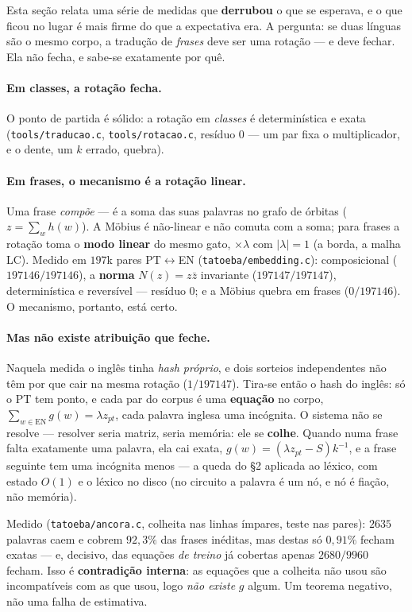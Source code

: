 \documentclass[11pt]{article}
\newcommand{\code}[1]{\texttt{\small #1}}
\theoremstyle{plain}
\theoremstyle{remark}
\begin{document}
Esta seção relata uma série de medidas que \textbf{derrubou} o que se esperava, e o que ficou no lugar
é mais firme do que a expectativa era. A pergunta: se duas línguas são o mesmo corpo, a tradução de
\emph{frases} deve ser uma rotação --- e deve fechar. Ela não fecha, e sabe-se exatamente por quê.

\paragraph{Em classes, a rotação fecha.} O ponto de partida é sólido: a rotação em \emph{classes} é
determinística e exata (\code{tools/traducao.c}, \code{tools/rotacao.c}, resíduo $0$ --- um par fixa o
multiplicador, e o dente, um $k$ errado, quebra).

\paragraph{Em frases, o mecanismo é a rotação linear.} Uma frase \emph{compõe} --- é a soma das suas
palavras no grafo de órbitas ($z=\sum_w h(w)$). A Möbius é não-linear e não comuta com a soma; para
frases a rotação toma o \textbf{modo linear} do mesmo gato, $\times\lambda$ com $|\lambda|=1$ (a borda,
a malha LC). Medido em $197$k pares PT$\leftrightarrow$EN (\code{tatoeba/embedding.c}): composicional
($197146/197146$), a \textbf{norma} $N(z)=z\bar z$ invariante ($197147/197147$), determinística e
reversível --- resíduo $0$; e a Möbius quebra em frases ($0/197146$). O mecanismo, portanto, está
certo.

\paragraph{Mas não existe atribuição que feche.} Naquela medida o inglês tinha \emph{hash próprio}, e
dois sorteios independentes não têm por que cair na mesma rotação ($1/197147$). Tira-se então o hash do
inglês: só o PT tem ponto, e cada par do corpus é uma \textbf{equação} no corpo,
$\sum_{w\in\mathrm{EN}} g(w)=\lambda z_{pt}$, cada palavra inglesa uma incógnita. O sistema não se
resolve --- resolver seria matriz, seria memória: ele se \textbf{colhe}. Quando numa frase falta
exatamente uma palavra, ela cai exata, $g(w)=(\lambda z_{pt}-S)k^{-1}$, e a frase seguinte tem uma
incógnita menos --- a queda do §2 aplicada ao léxico, com estado $O(1)$ e o léxico no disco (no
circuito a palavra é um nó, e nó é fiação, não memória).

Medido (\code{tatoeba/ancora.c}, colheita nas linhas ímpares, teste nas pares): $2635$ palavras caem e
cobrem $92{,}3\%$ das frases inéditas, mas destas só $0{,}91\%$ fecham exatas --- e, decisivo, das
equações \emph{de treino} já cobertas apenas $2680/9960$ fecham. Isso é \textbf{contradição interna}:
as equações que a colheita não usou são incompatíveis com as que usou, logo \emph{não existe} $g$
algum. Um teorema negativo, não uma falha de estimativa.
\end{document}
